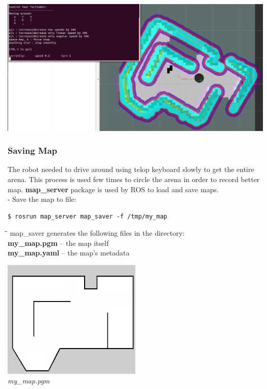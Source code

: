 \documentclass[10pt,a4paper]{article}
\begin{document}
\begin{center}
\includegraphics[width=\textwidth]{images/BuildingMap+keyboard.png}
\end{center}

\subsubsection{Saving Map}

The robot needed to drive around using telop keyboard slowly to get the entire arena. This process is used few times to circle the arena in order to record better map. \textbf{map\_server} package is used by ROS to load and save maps. \\

- Save the map to file:
\begin{lstlisting}[frame=single] 
$ rosrun map_server map_saver -f /tmp/my_map
\end{lstlisting}

\begin{tabbing}
\hspace{1cm}\=\hspace{1cm}\=\kill
map\_saver generates the following files in the directory:\\
\> \textbf{my\_map.pgm} – the map itself \\
\> \textbf{my\_map.yaml} – the map’s metadata \\
\end{tabbing}

\begin{center}
\includegraphics[width=0.5\textwidth]{images/diegoMap.png}\\
\textit{my\_map.pgm}
\end{center}
\end{document}
